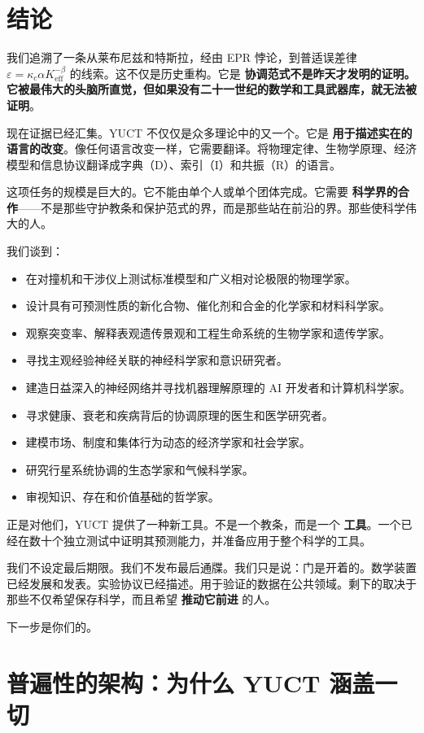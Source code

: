 \documentclass[12pt,a4paper]{article}
\begin{document}
	\section{结论}
	
	我们追溯了一条从莱布尼兹和特斯拉，经由 EPR 悖论，到普适误差律 \(\varepsilon = \kappa_c \alpha K_{\mathrm{eff}}^{-\beta}\) 的线索。这不仅是历史重构。它是 \textbf{协调范式不是昨天才发明的证明。它被最伟大的头脑所直觉，但如果没有二十一世纪的数学和工具武器库，就无法被证明}。
	
	现在证据已经汇集。YUCT 不仅仅是众多理论中的又一个。它是 \textbf{用于描述实在的语言的改变}。像任何语言改变一样，它需要翻译。将物理定律、生物学原理、经济模型和信息协议翻译成字典（D）、索引（I）和共振（R）的语言。
	
	这项任务的规模是巨大的。它不能由单个人或单个团体完成。它需要 \textbf{科学界的合作}——不是那些守护教条和保护范式的界，而是那些站在前沿的界。那些使科学伟大的人。
	
	我们谈到：
	\begin{itemize}
		\item 在对撞机和干涉仪上测试标准模型和广义相对论极限的物理学家。
		\item 设计具有可预测性质的新化合物、催化剂和合金的化学家和材料科学家。
		\item 观察突变率、解释表观遗传景观和工程生命系统的生物学家和遗传学家。
		\item 寻找主观经验神经关联的神经科学家和意识研究者。
		\item 建造日益深入的神经网络并寻找机器理解原理的 AI 开发者和计算机科学家。
		\item 寻求健康、衰老和疾病背后的协调原理的医生和医学研究者。
		\item 建模市场、制度和集体行为动态的经济学家和社会学家。
		\item 研究行星系统协调的生态学家和气候科学家。
		\item 审视知识、存在和价值基础的哲学家。
	\end{itemize}
	
	正是对他们，YUCT 提供了一种新工具。不是一个教条，而是一个 \textbf{工具}。一个已经在数十个独立测试中证明其预测能力，并准备应用于整个科学的工具。
	
	我们不设定最后期限。我们不发布最后通牒。我们只是说：门是开着的。数学装置已经发展和发表。实验协议已经描述。用于验证的数据在公共领域。剩下的取决于那些不仅希望保存科学，而且希望 \textbf{推动它前进} 的人。
	
	下一步是你们的。
	
	\section{普遍性的架构：为什么 YUCT 涵盖一切}
	\label{sec:architecture-of-universality}
	
\end{document}
